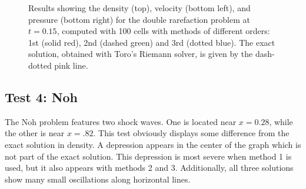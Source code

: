 \documentclass[10pt]{article}
\begin{document}
\begin{figure}[h]
\begin{center}
\begin{tabular}{cc}
	\end{tabular}
  \end{center}
  \caption{Results showing the density (top), velocity (bottom left), and pressure (bottom right) for the double rarefaction problem at $t=0.15$, computed with 100 cells with methods of different orders: 1st (solid red), 2nd (dashed green) and 3rd (dotted blue). The exact solution, obtained with Toro's Riemann solver, is given by the dash-dotted pink line.}
  \label{fig:den_T3}
\end{figure}


\clearpage

\subsection{Test 4: Noh}
The Noh problem features two shock waves. One is located near $x=0.28$, while the other is near $x=.82$.
This test obviously displays some difference from the exact solution in density. A depression appears in the center of the graph which is not part of the exact solution. This depression is most severe when method 1 is used, but it also appears with methods 2 and 3. Additionally, all three solutions show many small oscillations along horizontal lines. 
\end{document}
